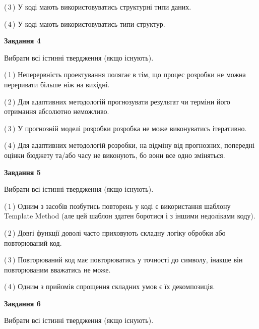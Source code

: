 \documentclass[10pt, ukrainian]{article}
\begin{document}
{\begin {large}
(\,3\,) У коді мають використовуватись структурні типи даних. %



(\,4\,) У коді мають використовуватись типи структур. %


{\begin {center}\textbf{Завдання 4}\end {center}}\par
Вибрати всі істинні твердження (якщо існують).\par
\vspace{2mm}



(\,1\,) Неперервність проектування полягає в тім, що процес розробки не можна переривати більше ніж на вихідні. %



(\,2\,) Для адаптивних методологій прогнозувати результат чи терміни його отримання абсолютно неможливо. %



(\,3\,) У прогнозній моделі розробки розробка не може виконуватись ітеративно. %



(\,4\,) Для адаптивних методологій розробки, на відміну від прогнозних, попередні оцінки бюджету та/або часу не виконують, бо вони все одно зміняться. %


{\begin {center}\textbf{Завдання 5}\end {center}}\par
Вибрати всі істинні твердження (якщо існують).\par
\vspace{2mm}



(\,1\,) Одним з засобів позбутись повторень у коді є використання шаблону Template Method (але цей шаблон здатен боротися і з іншими недоліками коду). %



(\,2\,) Довгі функції доволі часто приховують складну логіку обробки або повторюваний код. %



(\,3\,) Повторюваний код має повторюватись у точності до символу, інакше він повторюваним вважатись не може. %



(\,4\,) Одним з прийомів спрощення складних умов є їх декомпозиція. %

\newpage

{\begin {center}\textbf{Завдання 6}\end {center}}\par
Вибрати всі істинні твердження (якщо існують).\par
\vspace{2mm}




\end{large}}
\end{document}
